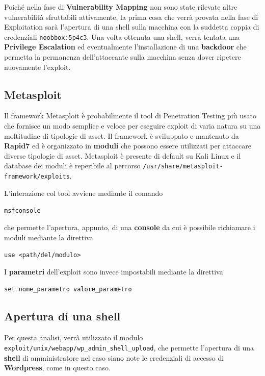 \documentclass[a4paper, 12pt, oneside]{article}
\begin{document}
Poiché nella fase di \textbf{Vulnerability Mapping} non sono state rilevate altre vulnerabilità sfruttabili attivamente, la prima cosa che verrà provata nella fase di Exploitation sarà l'apertura di una shell sulla macchina con la suddetta coppia di credenziali \texttt{noobbox:5p4c3}. 
Una volta ottenuta una shell, verrà tentata una \textbf{Privilege Escalation} ed eventualmente l'installazione di una \textbf{backdoor} che permetta la permanenza dell'attaccante sulla macchina senza dover ripetere nuovamente l'exploit.

\subsection{Metasploit}
Il framework Metasploit è probabilmente il tool di Penetration Testing più usato che fornisce un modo semplice e veloce per eseguire exploit di varia natura su una moltitudine di tipologie di asset. Il framework è sviluppato e mantenuto da \textbf{Rapid7} ed è organizzato in \textbf{moduli} \cite{metasploit} che possono essere utilizzati per attaccare diverse tipologie di asset. Metasploit è presente di default su Kali Linux e il database dei moduli è reperibile al percorso \texttt{/usr/share/metasploit-framework/exploits}.

L'interazione col tool avviene mediante il comando

\begin{center}
    \texttt{msfconsole}
\end{center}

che permette l'apertura, appunto, di una \textbf{console} da cui è possibile richiamare i moduli mediante la direttiva

\begin{center}
    \texttt{use <path/del/modulo>}
\end{center}

I \textbf{parametri} dell'exploit sono invece impostabili mediante la direttiva

\begin{center}
    \texttt{set nome\_parametro valore\_parametro}
\end{center}

\subsection{Apertura di una shell}

Per questa analisi, verrà utilizzato il modulo \texttt{exploit/unix/webapp/wp\_admin\_shell\_upload}, che permette l'apertura di una \textbf{shell} di amministratore nel caso siano note le credenziali di accesso di \textbf{Wordpress}, come in questo caso.
\end{document}

